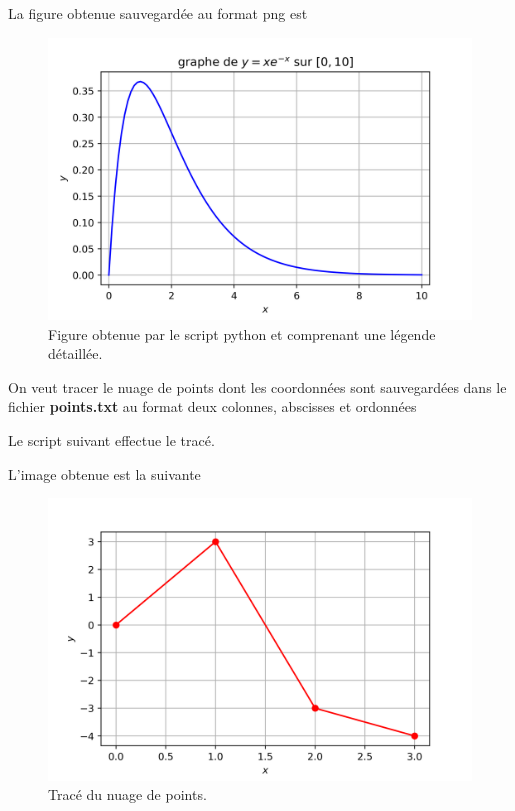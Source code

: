 \documentclass[a4paper,12pt]{article}
\begin{document}
La figure obtenue sauvegardée au format png est 
\begin{figure}[h]
\begin{center}
\includegraphics[width=14cm]{./png/expo.png}
\end{center}
\caption{Figure obtenue par le script python et comprenant une légende détaillée.}
\end{figure}

\begin{leftbar}
On veut tracer le nuage de points dont les coordonnées sont sauvegardées dans le fichier \textbf{points.txt} au format deux colonnes, abscisses et ordonnées
\end{leftbar}

Le script suivant effectue le tracé.

 

L'image obtenue est la suivante
\begin{figure}[h]
\begin{center}
\includegraphics[width=14cm]{./png/points.png}
\end{center}
\caption{Tracé du nuage de points.}
\end{figure}
 
\end{document}
